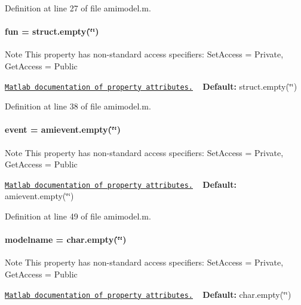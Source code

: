 Definition at line 27 of file amimodel.\+m.

\hypertarget{classamimodel_a743fa290dbc0a67a3843d5ab0426e9b4}{}
\paragraph[{fun}]{\setlength{\rightskip}{0pt plus 5cm}fun = struct.\+empty(\char`\"{}\char`\"{})}\label{classamimodel_a743fa290dbc0a67a3843d5ab0426e9b4}
\begin{DoxyNote}{Note}
This property has non-\/standard access specifiers\+: {\ttfamily Set\+Access = Private, Get\+Access = Public} 

\href{http://www.mathworks.com/help/matlab/matlab_oop/property-attributes.html}{\tt Matlab documentation of property attributes.} ~\newline
{\bfseries Default\+:} struct.\+empty(\char`\"{}\char`\"{}) 
\end{DoxyNote}


Definition at line 38 of file amimodel.\+m.

\hypertarget{classamimodel_a3b65133bb9997cd1ccf311af0927fc9e}{}
\paragraph[{event}]{\setlength{\rightskip}{0pt plus 5cm}event = amievent.\+empty(\char`\"{}\char`\"{})}\label{classamimodel_a3b65133bb9997cd1ccf311af0927fc9e}
\begin{DoxyNote}{Note}
This property has non-\/standard access specifiers\+: {\ttfamily Set\+Access = Private, Get\+Access = Public} 

\href{http://www.mathworks.com/help/matlab/matlab_oop/property-attributes.html}{\tt Matlab documentation of property attributes.} ~\newline
{\bfseries Default\+:} amievent.\+empty(\char`\"{}\char`\"{}) 
\end{DoxyNote}


Definition at line 49 of file amimodel.\+m.

\hypertarget{classamimodel_a71bca9c21a6de42d8079ade31cb61044}{}
\paragraph[{modelname}]{\setlength{\rightskip}{0pt plus 5cm}modelname = char.\+empty(\char`\"{}\char`\"{})}\label{classamimodel_a71bca9c21a6de42d8079ade31cb61044}
\begin{DoxyNote}{Note}
This property has non-\/standard access specifiers\+: {\ttfamily Set\+Access = Private, Get\+Access = Public} 

\href{http://www.mathworks.com/help/matlab/matlab_oop/property-attributes.html}{\tt Matlab documentation of property attributes.} ~\newline
{\bfseries Default\+:} char.\+empty(\char`\"{}\char`\"{}) 
\end{DoxyNote}


